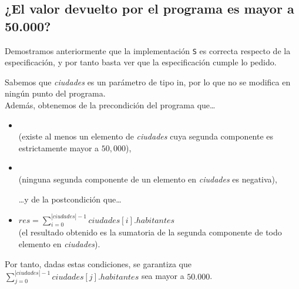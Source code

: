 \documentclass[10pt,a4paper]{article}
\begin{document}
\newpage

\subsection{¿El valor devuelto por el programa es mayor a 50.000?}

Demostramos anteriormente que la implementación \texttt{S} es correcta respecto de la especificación, y por tanto basta ver que la especificación cumple lo pedido.

Sabemos  que \textit{ciudades} es un parámetro de tipo \textsf{in}, por lo que no se modifica en ningún punto del programa. \\
Además, obtenemos de la precondición del programa que\ldots

\begin{itemize}
    \item{ \\
          (existe al menos un elemento de \textit{ciudades} cuya segunda componente es estrictamente mayor a $50,000$),}
    \item{ \\
          (ninguna segunda componente de un elemento en \textit{ciudades} es negativa),}

\ldots y de la postcondición que\ldots

    \item{$res = \sum\limits_{i = 0}^{|ciudades| - 1} ciudades[i].habitantes$ \\
          (el resultado obtenido es la sumatoria de la segunda componente de todo elemento en \textit{ciudades}).}
\end{itemize}

Por tanto, dadas estas condiciones, se garantiza que $\sum\limits_{j = 0}^{|ciudades| - 1} ciudades[j].habitantes$ sea mayor a $50.000$.
\end{document}
